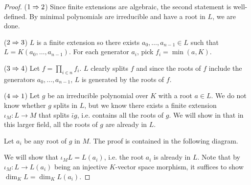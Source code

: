 \documentclass[../book.tex]{subfiles}
\begin{document}
\begin{proof}
    ($1 \Rightarrow 2$) 
        Since finite extensions are algebraic, the second statement is well-defined.
        By minimal polynomials are irreducible and have a root in $L$, we are done. 
        
    ($2 \Rightarrow 3$)
        $L$ is a finite extension so 
        there exists $a_0,\dots,a_{n-1} \in L$ such that $L = K(a_0,\dots,a_{n-1})$.
        For each generator $a_i$, pick $f_i = \min(a,K)$. 
    
    ($3 \Rightarrow 4$)
        Let $f = \prod_{i\in n} f_i$. 
        $L$ clearly splits $f$ and 
        since the roots of $f$ include the generators $a_0,\dots,a_{n-1}$,
        $L$ is generated by the roots of $f$. 
        
    ($4 \Rightarrow 1$) 
        Let $g$ be an irreducible polynomial over $K$ with a root $a \in L$. 
        We do not know whether $g$ splits in $L$, 
        but we know there exists a finite extension $\iota_M : L \to M$
        that splits $\bar\iota g$, i.e. contains all the roots of $g$. 
        We will show in that in this larger field, 
        all the roots of $g$ are already in $L$. 
        
        Let $a_i$ be any root of $g$ in $M$.  
        The proof is contained in the following diagram. 
        \begin{figure} [H]
            \centering
        \end{figure}
        We will show that $\iota_M L = L(a_i)$, i.e. the root $a_i$ is already in $L$.
        Note that by $\iota_M : L \to L(a_i)$ being 
        an injective $K$-vector space morphism, 
        it suffices to show $\dim_K L = \dim_K L(a_i)$.
        

\end{proof}
\end{document}

